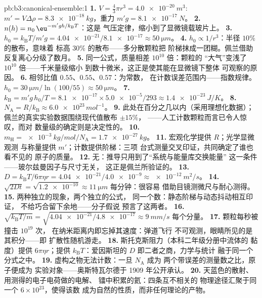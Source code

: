 \begin{solution}{pb:b3:canonical-ensemble:1}
\textbf{1.} $V = \tfrac43\pi r^3 = \qty{4.0e-20}{m^3}$: $m' = V
\Delta\rho = \qty{8.3e-18}{kg}$，重力 $m'g = \qty{8.1e-17}{N}$。
\textbf{2.} $n(h) = n_0\,\eu^{-m'gh/k_{\text{B}}T}$：这是
气压定律，缩小到了显微镜载玻片上。
\textbf{3.} $h_0 = k_{\text{B}}T/m'g = \num{4.04e-21}/\num{8.1e-17}
\approx \qty{50}{\micro m}$。
\textbf{4.} $h_0 \propto 1/r^3$：半径 $10\%$ 的散布，意味着
标高 $30\%$ 的散布——多分散颗粒把
阶梯抹成一团糊。佩兰借助
反复离心分级了数月。
\textbf{5.} 同一公式，质量相差 $10^{10}$ 倍：颗粒的
“大气”变浅了 $10^{10}$ 倍——千米量级缩小
到数十微米，这正是使其能在显微镜下整体
可观察的原因。
\textbf{6.} 相邻比值 $0.55$、$0.55$、$0.57$：为常数，
在计数误差范围内——指数规律。$h_0 =
\qty{30}{\micro m}/\ln(100/55) \approx \qty{50}{\micro m}$。
\textbf{7.} $k_{\text{B}} = m'g\,h_0/T = \num{8.1e-17} \times
\num{5.0e-5}/293 \approx \qty{1.4e-23}{J/K}$。
\textbf{8.} $N_{\text{A}} = R/k_{\text{B}} \approx
\num{6.0e23}\,\unit{mol^{-1}}$。
\textbf{9.} 此处在百分之几以内（采用理想化数据）；
佩兰的真实实验数据围绕现代值散布 $\pm15\%$，
——人工计数颗粒而言已令人惊叹，而对
数量级的确定则是决定性的。
\textbf{10.} $m_{\text{H}} = \qty{e-3}{kg/mol}/N_{\text{A}} =
\qty{1.7e-27}{kg}$。
\textbf{11.} 宏观化学提供 $R$；光学显微观测
与称量提供 $m'$；计数提供阶梯：三项
台式测量交叉印证，共同确定了谁也看不见的
原子的质量。
\textbf{12.} 无：推导只用到了“系统与能量库交换能量”
这一条件——玻尔兹曼因子与尺寸无关，
这正是佩兰所验证的。
\textbf{13.} $D = k_{\text{B}}T/6\pi\eta r =
\num{4.04e-21}/\num{4.0e-9} \approx \qty{e-12}{m^2/s}$。
\textbf{14.} $\sqrt{2Dt} = \sqrt{\num{1.2e-10}} \approx
\qty{11}{\micro m}$ 每分钟：很容易
借助目镜测微尺与耐心测得。
\textbf{15.} 两种独立的现象，两个独立的公式，
同一个数：静态阶梯与动态抖动相互印证，
不给巧合留下余地——分子假说
预言了这两者。
\textbf{16.} $\sqrt{k_{\text{B}}T/m} = \sqrt{\num{4.04e-21}/
\num{4.8e-17}} \approx \qty{9}{mm/s}$ 每个分量。
\textbf{17.} 颗粒每秒被撞击 $10^{19}$ 次，
在纳米距离内即忘掉其速度：弹道飞行
不可观测，眼睛所见的是其积分——即
扩散性随机游走。
\textbf{18.} 斯托克斯阻力（本科二年级分册中流体的
黏度）提供 $6\pi\eta r$；提供
$k_{\text{B}}T$：爱因斯坦的 $D$ 即二者之商，力学与统计
融于同一个分式之中。
\textbf{19.} 虚构之物无法计数：一旦 $N_{\text{A}}$ 成为
两个带误差的测量数之比，原子便成为
实验对象——奥斯特瓦尔德于 1909 年公开承认。
\textbf{20.} 天蓝色的散射、用测得的电子电荷做的电解、
镭中积累的氦：四条互不相关的
物理途径汇聚于同一个 $6\times10^{23}$，使得该数
成为自然的性质，而非任何理论的产物。

\end{solution}
